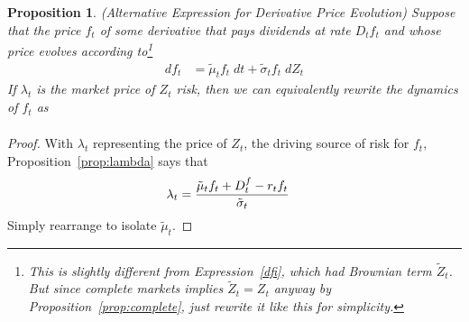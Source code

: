 \documentclass[12pt]{article}
\theoremstyle{plain}
\newtheorem{prop}[thm]{Proposition}
\theoremstyle{definition}
\theoremstyle{remark}
\begin{document}
\begin{prop}
\emph{(Alternative Expression for Derivative Price Evolution)}
Suppose that the price $f_t$ of some derivative that pays dividends at
rate $D_tf_t$ and whose price evolves according
to\footnote{%
  This is slightly different from
  Expression~\ref{dfi}, which had Brownian term $\tilde{Z}_t$.
  But since complete markets implies $\tilde{Z}_t=Z_t$ anyway by
  Proposition~\ref{prop:complete}, just rewrite it like this for
  simplicity.
}
\begin{align*}
  df_{t}
  &=
  \tilde{\mu}_tf_t
  \; dt
  +
  \tilde{\sigma}_tf_t
  \;dZ_t
\end{align*}
If $\lambda_t$ is the market price of $Z_t$ risk, then we can
equivalently rewrite the dynamics of $f_t$ as
\begin{align*}
\end{align*}
\end{prop}
\begin{proof}
With $\lambda_t$ representing the price of $Z_t$, the driving source of
risk for $f_t$, Proposition~\ref{prop:lambda} says that
\begin{align*}
  \lambda_t
  &=
  \frac{%
    \tilde{\mu}_{t}f_t+D_{t}^f
    -
    r_tf_{t}
  }{\tilde{\sigma}_{t}}
\end{align*}
Simply rearrange to isolate $\tilde{\mu}_t$.
\end{proof}
\end{document}
